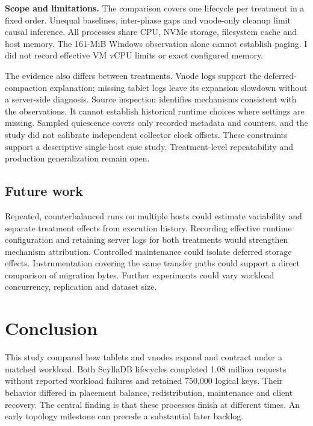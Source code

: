 \textbf{Scope and limitations.} The comparison covers one lifecycle per treatment in a fixed order. Unequal baselines, inter-phase gaps and vnode-only cleanup limit causal inference. All processes share CPU, NVMe storage, filesystem cache and host memory. The 161-MiB Windows observation alone cannot establish paging. I did not record effective VM vCPU limits or exact configured memory.

The evidence also differs between treatments. Vnode logs support the deferred-compaction explanation; missing tablet logs leave its expansion slowdown without a server-side diagnosis. Source inspection identifies mechanisms consistent with the observations. It cannot establish historical runtime choices where settings are missing. Sampled quiescence covers only recorded metadata and counters, and the study did not calibrate independent collector clock offsets. These constraints support a descriptive single-host case study. Treatment-level repeatability and production generalization remain open.

\hypertarget{future-work}{%
\subsection{Future work}\label{future-work}}

Repeated, counterbalanced runs on multiple hosts could estimate variability and separate treatment effects from execution history. Recording effective runtime configuration and retaining server logs for both treatments would strengthen mechanism attribution. Controlled maintenance could isolate deferred storage effects. Instrumentation covering the same transfer paths could support a direct comparison of migration bytes. Further experiments could vary workload concurrency, replication and dataset size.

\newpage

\hypertarget{conclusion}{%
\section{Conclusion}\label{conclusion}}

This study compared how tablets and vnodes expand and contract under a matched workload. Both ScyllaDB lifecycles completed 1.08 million requests without reported workload failures and retained 750,000 logical keys. Their behavior differed in placement balance, redistribution, maintenance and client recovery. The central finding is that these processes finish at different times. An early topology milestone can precede a substantial later backlog.

